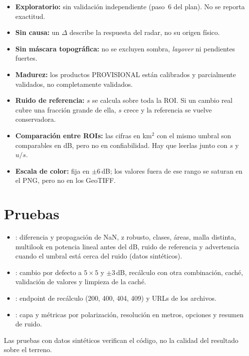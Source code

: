 \documentclass[11pt,a4paper]{article}
\begin{document}
\begin{itemize}
  \item \textbf{Exploratorio:} sin validación independiente (paso~6 del plan). No se reporta exactitud.
  \item \textbf{Sin causa:} un $\Delta$ describe la respuesta del radar, no su origen físico.
  \item \textbf{Sin máscara topográfica:} no se excluyen sombra, \emph{layover} ni pendientes fuertes.
  \item \textbf{Madurez:} los productos PROVISIONAL están calibrados y parcialmente validados, no
        completamente validados.
  \item \textbf{Ruido de referencia:} $s$ se calcula sobre toda la ROI. Si un cambio real cubre una
        fracción grande de ella, $s$ crece y la referencia se vuelve conservadora.
  \item \textbf{Comparación entre ROIs:} las cifras en km$^2$ con el mismo umbral son comparables en
        dB, pero no en confiabilidad. Hay que leerlas junto con $s$ y $u/s$.
  \item \textbf{Escala de color:} fija en $\pm 6$\,dB; los valores fuera de ese rango se saturan en el
        PNG, pero no en los GeoTIFF.
\end{itemize}

\section{Pruebas}

\begin{itemize}
  \item {}: diferencia y propagación de NaN, z robusto, clases,
        áreas, malla distinta, multilook en potencia lineal antes del dB, ruido de referencia y
        advertencia cuando el umbral está cerca del ruido (datos sintéticos).
  \item {}: cambio por defecto a $5\times5$ y $\pm3$\,dB,
        recálculo con otra combinación, caché, validación de valores y limpieza de la caché.
  \item {}: endpoint de recálculo (200, 400, 404, 409) y URLs de
        los archivos.
  \item {}: capa y métricas por polarización, resolución en
        metros, opciones y resumen de ruido.
\end{itemize}
Las pruebas con datos sintéticos verifican el código, no la calidad del resultado sobre el terreno.
\end{document}
